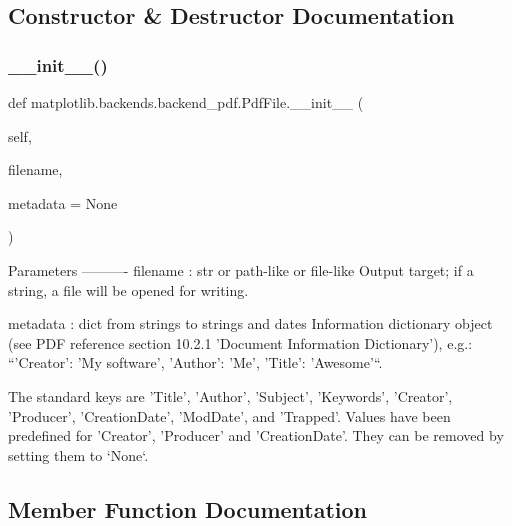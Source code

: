 \subsection{Constructor \& Destructor Documentation}
\mbox{\label{classmatplotlib_1_1backends_1_1backend__pdf_1_1PdfFile_a30e69dd6b158452832fd38c1ae042f6f}} 
\subsubsection{\texorpdfstring{\+\_\+\+\_\+init\+\_\+\+\_\+()}{\_\_init\_\_()}}
{\footnotesize\ttfamily def matplotlib.\+backends.\+backend\+\_\+pdf.\+Pdf\+File.\+\_\+\+\_\+init\+\_\+\+\_\+ (\begin{DoxyParamCaption}\item[{}]{self,  }\item[{}]{filename,  }\item[{}]{metadata = {\ttfamily None} }\end{DoxyParamCaption})}

\begin{DoxyVerb}Parameters
----------
filename : str or path-like or file-like
    Output target; if a string, a file will be opened for writing.

metadata : dict from strings to strings and dates
    Information dictionary object (see PDF reference section 10.2.1
    'Document Information Dictionary'), e.g.:
    ``{'Creator': 'My software', 'Author': 'Me', 'Title': 'Awesome'}``.

    The standard keys are 'Title', 'Author', 'Subject', 'Keywords',
    'Creator', 'Producer', 'CreationDate', 'ModDate', and
    'Trapped'. Values have been predefined for 'Creator', 'Producer'
    and 'CreationDate'. They can be removed by setting them to `None`.
\end{DoxyVerb}
 

\subsection{Member Function Documentation}
\mbox{\label{classmatplotlib_1_1backends_1_1backend__pdf_1_1PdfFile_a0e4ee768db58561337c0511c3dda0e3c}} 
